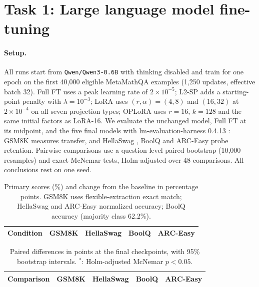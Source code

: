 \documentclass{article}
\begin{document}
\section{Task 1: Large language model fine-tuning}
\paragraph{Setup.} All runs start from \texttt{Qwen/Qwen3-0.6B} \citep{yang2025qwen3} with thinking disabled and train for one epoch on the first 40,000 eligible MetaMathQA examples \citep{yu2023metamath} (1,250 updates, effective batch 32). Full FT uses a peak learning rate of $2\times10^{-5}$; L2-SP \citep{li2018l2sp} adds a starting-point penalty with $\lambda=10^{-3}$; LoRA \citep{hu2022lora} uses $(r,\alpha)=(4,8)$ and $(16,32)$ at $2\times10^{-4}$ on all seven projection types; OPLoRA \citep{xiong2025oplora} uses $r=16$, $k=128$ and the same initial factors as LoRA-16. We evaluate the unchanged model, Full FT at its midpoint, and the five final models with lm-evaluation-harness 0.4.13 \citep{lmeval}: GSM8K \citep{cobbe2021gsm8k} measures transfer, and HellaSwag \citep{zellers2019hellaswag}, BoolQ \citep{clark2019boolq} and ARC-Easy \citep{clark2018arc} probe retention. Pairwise comparisons use a question-level paired bootstrap (10,000 resamples) and exact McNemar tests, Holm-adjusted over 48 comparisons. All conclusions rest on one seed.

\begin{table}[t]
\centering\small
\caption{Primary scores (\%) and change from the baseline in percentage points. GSM8K uses flexible-extraction exact match; HellaSwag and ARC-Easy normalized accuracy; BoolQ accuracy (majority class 62.2\%).}
\label{tab:t1}
\begin{tabular}{lcccc}
\toprule
Condition & GSM8K & HellaSwag & BoolQ & ARC-Easy \\
\midrule

\bottomrule
\end{tabular}
\end{table}

\begin{table}[t]
\centering\footnotesize
\caption{Paired differences in points at the final checkpoints, with 95\% bootstrap intervals. $^{*}$: Holm-adjusted McNemar $p<0.05$.}
\label{tab:t1tests}
\begin{tabular}{lcccc}
\toprule
Comparison & GSM8K & HellaSwag & BoolQ & ARC-Easy \\
\midrule

\bottomrule
\end{tabular}
\end{table}
\end{document}
